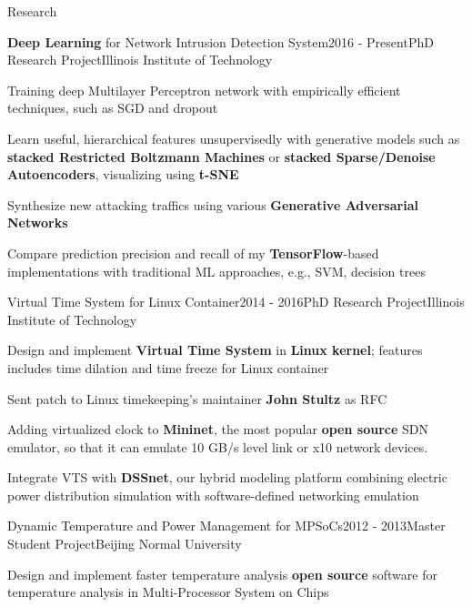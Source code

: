 \documentclass{resume} %
\begin{document}

\begin{rSection}{Research}

\begin{rSubsection}{\textbf{Deep Learning} for Network Intrusion Detection System}{2016 - Present}{PhD Research Project}{Illinois Institute of Technology}
\item Training deep Multilayer Perceptron network with empirically efficient techniques, such as SGD and dropout
\item Learn useful, hierarchical features unsupervisedly with generative models such as \textbf{stacked Restricted Boltzmann Machines} or \textbf{stacked Sparse/Denoise Autoencoders}, visualizing using \textbf{t-SNE}
\item Synthesize new attacking traffics using various \textbf{Generative Adversarial Networks}
\item Compare prediction precision and recall of my \textbf{TensorFlow}-based implementations with traditional ML approaches, e.g., SVM, decision trees
\end{rSubsection}

\begin{rSubsection}{Virtual Time System for Linux Container}{2014 - 2016}{PhD Research Project}{Illinois Institute of Technology}
\item Design and implement \textbf{Virtual Time System} in \textbf{Linux kernel}; features includes time dilation and time freeze for Linux container
\item Sent patch to Linux timekeeping's maintainer \textbf{John Stultz} as RFC
\item Adding virtualized clock to \textbf{Mininet}, the most popular \textbf{open source} SDN emulator, so that it can emulate 10 GB/s level link or x10 network devices.
\item Integrate VTS with \textbf{DSSnet}, our hybrid modeling platform combining electric power distribution simulation with software-defined networking emulation
\end{rSubsection}

\begin{rSubsection}{Dynamic Temperature and Power Management for MPSoCs}{2012 - 2013}{Master Student Project}{Beijing Normal University}
\item Design and implement faster temperature analysis \textbf{open source} software for temperature analysis in Multi-Processor System on Chips
\end{rSubsection}

\end{rSection}
\end{document}
